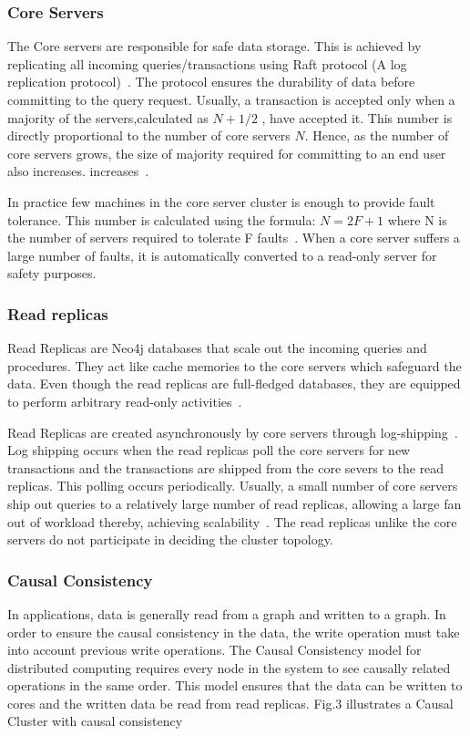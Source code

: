 \documentclass[9pt,twocolumn,twoside]{styles/osajnl}
\begin{document}
\subsubsection{Core Servers}
The Core servers are responsible for safe data storage. This is achieved by replicating all incoming queries/transactions using Raft protocol (A log replication protocol)~\cite{www-neo4j-causal}. The protocol ensures the durability of data before committing to the query request. Usually, a transaction is accepted only when a majority of the servers,calculated as $N+1/2$ , have accepted it. This number is directly proportional to the number of core servers $N$. Hence, as the number of core servers grows, the size of majority required for committing to an end user also increases. increases~\cite{www-neo4j-causal}. 

In practice few machines in the core server cluster is enough to provide fault tolerance. This number is calculated using the formula: $N = 2F +1 $ where N is the number of servers required to tolerate F faults~\cite{www-neo4j-causal}. When a core server suffers a large number of faults, it is automatically converted to a read-only server for safety purposes. 

\subsubsection{Read replicas}
Read Replicas are Neo4j databases that scale out the incoming queries and procedures. They act like cache memories to the core servers which safeguard the data. Even though the read replicas are full-fledged databases, they are equipped to perform arbitrary read-only activities~\cite{www-neo4j-causal}.

Read Replicas are created asynchronously by core servers through log-shipping~\cite{www-neo4j-causal}. Log shipping occurs when the read replicas poll the core servers for new transactions and the transactions are shipped from the core severs to the read replicas. This polling occurs periodically. Usually, a small number of core servers ship out queries to a relatively large number of read replicas, allowing a large fan out of workload thereby, achieving scalability~\cite{www-neo4j-causal}. The read replicas unlike the core servers do not participate in deciding the cluster topology. 

\subsubsection{Causal Consistency}
In applications, data is generally read from a graph and written to a graph. In order to ensure the causal consistency in the data, the write operation must take into account previous write operations. The Causal Consistency model for distributed computing requires every node in the system to see causally related operations in the same order. This model ensures that the data can be written to cores and the written data be read from read replicas.
Fig.3 illustrates a Causal Cluster with causal consistency
\end{document}
